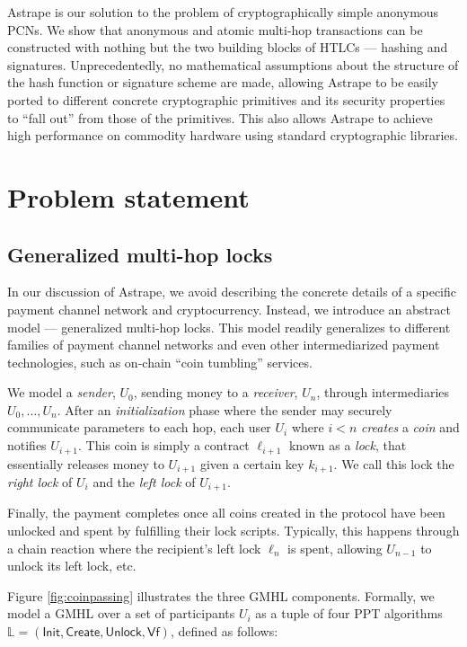 \documentclass[USenglish,oneside,twocolumn]{article}
\begin{document}
Astrape is our solution to the problem of cryptographically simple anonymous PCNs. We show that anonymous and atomic multi-hop transactions can be constructed with nothing but the two building blocks of HTLCs --- hashing and signatures. Unprecedentedly, no mathematical assumptions about the structure of the hash function or signature scheme are made, allowing Astrape to be easily ported to different concrete cryptographic primitives and its security properties to ``fall out'' from those of the primitives. This also allows Astrape to achieve high performance on commodity hardware using standard cryptographic libraries.

\section{Problem statement} \label{sec:probstat}

\subsection{Generalized multi-hop locks}

In our discussion of Astrape, we avoid describing the concrete details of a specific payment channel network and cryptocurrency. Instead, we introduce an abstract model --- generalized multi-hop locks.  This model readily generalizes to different families of payment channel networks and even other intermediarized payment technologies, such as on-chain ``coin tumbling'' services.

We model a \emph{sender}, $U_0$, sending money to a \emph{receiver}, $U_n$, through intermediaries $U_0,\dots,U_n$. After an \emph{initialization} phase where the sender may securely communicate parameters to each hop, each user $U_i$ where $i<n$ \emph{creates} a \emph{coin} and notifies $U_{i+1}$. This coin is simply a contract $\ell_{i+1}$ known as a \emph{lock}, that essentially releases money to $U_{i+1}$ given a certain key $k_{i+1}$. We call this lock the \emph{right lock} of $U_{i}$ and the \emph{left lock} of $U_{i+1}$.

Finally, the payment completes once all coins created in the protocol have been unlocked and spent by fulfilling their lock scripts. Typically, this happens through a chain reaction where the recipient's left lock $\ell_n$ is spent, allowing $U_{n-1}$ to unlock its left lock, etc.

Figure \ref{fig:coinpassing} illustrates the three GMHL components.  Formally, we model a GMHL over a set of participants $U_i$ as a tuple of four PPT algorithms $\mathbb{L}=(\mathsf{Init}, \mathsf{Create}, \mathsf{Unlock}, \mathsf{Vf})$, defined as follows:
\end{document}
